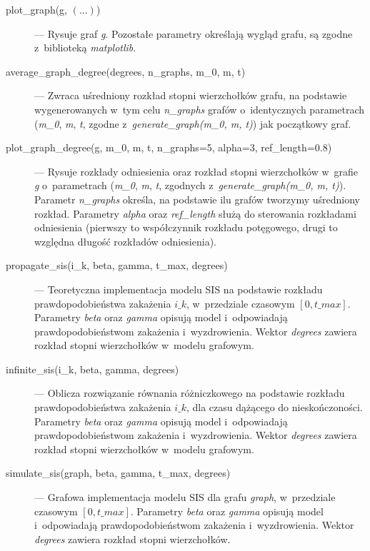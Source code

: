 \begin{enumerate}
\begin{description}
\item[plot\_graph(g, $\pmb{(...)}$)] --- Rysuje graf \emph{g}. Pozostałe parametry określają wygląd grafu, są zgodne z~biblioteką \emph{matplotlib}.
\item[average\_graph\_degree(degrees, n\_graphs, m\_0, m, t)] --- Zwraca uśredniony rozkład stopni wierzchołków grafu, na podstawie wygenerowanych w~tym celu \emph{n\_graphs} grafów o~identycznych parametrach (\emph{m\_0}, \emph{m}, \emph{t}, zgodne z~\emph{generate\_graph(m\_0, m, t)}) jak początkowy graf.
\item[plot\_graph\_degree(g, m\_0, m, t, n\_graphs=5, alpha=3, ref\_length=0.8)] --- Rysuje rozkłady odniesienia oraz rozkład stopni wierzchołków w~grafie \emph{g} o~parametrach (\emph{m\_0}, \emph{m}, \emph{t}, zgodnych z~\emph{generate\_graph(m\_0, m, t)}). Parametr \emph{n\_graphs} określa, na podstawie ilu grafów tworzymy uśredniony rozkład. Parametry \emph{alpha} oraz \emph{ref\_length} służą do sterowania rozkładami odniesienia (pierwszy to współczynnik rozkładu potęgowego, drugi to względna długość rozkładów odniesienia).
\item[propagate\_sis(i\_k, beta, gamma, t\_max, degrees)] --- Teoretyczna implementacja modelu SIS na podstawie rozkładu prawdopodobieństwa zakażenia $i\_k$, w~przedziale czasowym $[0, t\_max]$. Parametry \emph{beta} oraz \emph{gamma} opisują model i~odpowiadają prawdopodobieństwom zakażenia i~wyzdrowienia. Wektor \emph{degrees} zawiera rozkład stopni wierzchołków w~modelu grafowym.
\item[infinite\_sis(i\_k, beta, gamma, degrees)] --- Oblicza rozwiązanie równania różniczkowego na podstawie rozkładu prawdopodobieństwa zakażenia $i\_k$, dla czasu dążącego do nieskończoności. Parametry \emph{beta} oraz \emph{gamma} opisują model i~odpowiadają prawdopodobieństwom zakażenia i~wyzdrowienia. Wektor \emph{degrees} zawiera rozkład stopni wierzchołków w~modelu grafowym.
\item[simulate\_sis(graph, beta, gamma, t\_max, degrees)] --- Grafowa implementacja modelu SIS dla grafu \emph{graph}, w~przedziale czasowym $[0, t\_max]$. Parametry \emph{beta} oraz \emph{gamma} opisują model i~odpowiadają prawdopodobieństwom zakażenia i~wyzdrowienia. Wektor \emph{degrees} zawiera rozkład stopni wierzchołków.

\end{description}
\end{enumerate}
